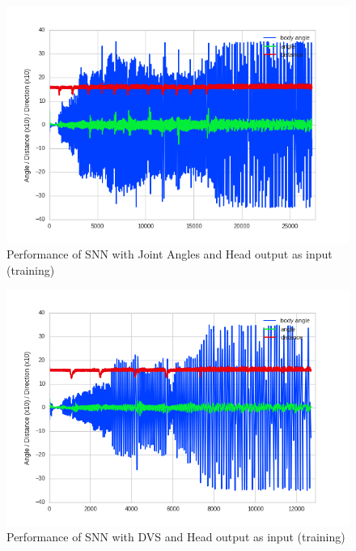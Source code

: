 \begin{figure}[htpb]
  \centering
  \includegraphics[scale=0.77]{figures/plots/newPlots/base2HJoints_perf}%
  \caption{ Performance of SNN with Joint Angles and Head output as input (training) }
  \label{fig:baADistB2JointH}
\end{figure}
\begin{figure}[htpb]
  \centering
  \includegraphics[scale=0.77]{figures/plots/newPlots/base2HDVS_perf}%
  \caption{ Performance of SNN with DVS and Head output as input (training)  }
  \label{fig:baADistB2DvsH}
\end{figure}


